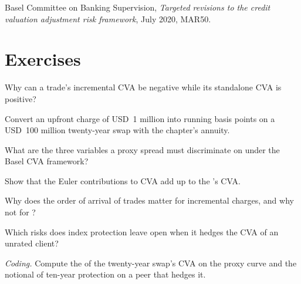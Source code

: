 \begin{omsources}
\item Basel Committee on Banking Supervision, \emph{Targeted revisions to the credit valuation
adjustment risk framework}, July 2020, MAR50.
\end{omsources}

\section{Exercises}

\begin{exercise}[$\star$]\label{exo:rc:the-valuation-adjustment-desk:1}
Why can a trade's incremental CVA be negative while its standalone CVA is positive?
\end{exercise}

\begin{exercise}[$\star$]\label{exo:rc:the-valuation-adjustment-desk:2}
Convert an upfront charge of USD~1 million into running basis points on a USD~100 million
twenty-year swap with the chapter's annuity.
\end{exercise}

\begin{exercise}[$\star$]\label{exo:rc:the-valuation-adjustment-desk:3}
What are the three variables a proxy spread must discriminate on under the Basel CVA
framework?
\end{exercise}

\begin{exercise}[$\star\star$]\label{exo:rc:the-valuation-adjustment-desk:4}
Show that the Euler contributions to CVA add up to the 's CVA.
\end{exercise}

\begin{exercise}[$\star\star$]\label{exo:rc:the-valuation-adjustment-desk:5}
Why does the order of arrival of trades matter for incremental charges, and why not for
?
\end{exercise}

\begin{exercise}[$\star\star$]\label{exo:rc:the-valuation-adjustment-desk:6}
Which risks does index protection leave open when it hedges the CVA of an unrated client?
\end{exercise}

\begin{exercise}[$\star\star\star$]\label{exo:rc:the-valuation-adjustment-desk:7}
\emph{Coding.} Compute the  of the twenty-year swap's CVA on the proxy curve and the
notional of ten-year protection on a peer that hedges it.
\end{exercise}

